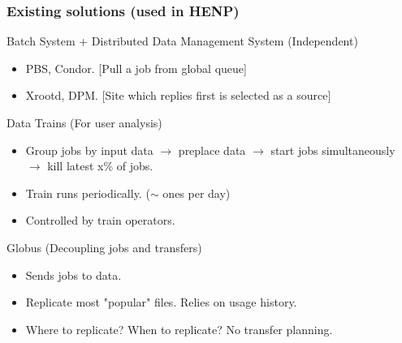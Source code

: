 \documentclass{beamer}
\begin{document}
\begin{frame}\frametitle{Existing solutions (used in HENP)} 	
\begin{block}{Batch System + Distributed Data Management System (Independent)}  
		\begin{itemize}
			\item PBS, Condor. [Pull a job from global queue]
			\item Xrootd, DPM. [Site which replies first is selected as a source] 			
		\end{itemize}
 	\end{block} 	
\begin{block}{Data Trains (For user analysis)}	
	 \begin{itemize}
	 \item Group jobs by input data $\longrightarrow$ preplace data $\longrightarrow$ start jobs simultaneously $\longrightarrow$ kill latest x\% of jobs. 
	 \item Train runs periodically. ($\sim$ ones per day)  
 	 \item Controlled by train operators. 
 	  \end{itemize}
\end{block}
\begin{block}{Globus (Decoupling jobs and transfers)} 	
\begin{itemize}
 	 \item Sends jobs to data.  
 	 \item Replicate most "popular" files. Relies on usage history.
 	 \item Where to replicate? When to replicate? No transfer planning.
 	 \end{itemize}
\end{block} 	 
\end{frame}
\end{document}
